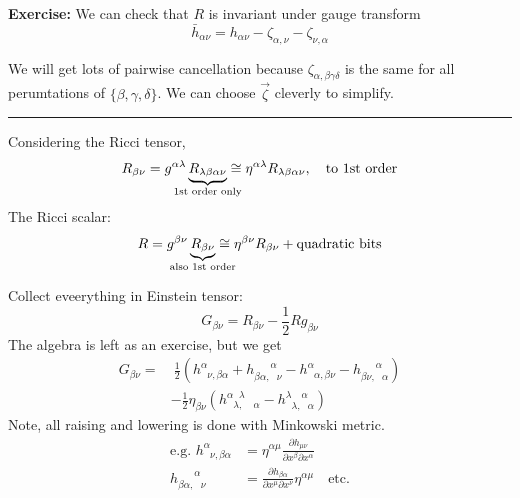 \documentclass[a4paper]{article} %
\newcommand{\exercise}[2]
{
\begin{framed}
\textbf{Exercise:} #1 \\\hrule
#2
\end{framed}
}
\begin{document}
\exercise{We can check that $R$ is invariant under gauge transform
\begin{equation}
\bar{h}_{\alpha\nu}=h_{\alpha\nu}-\zeta_{\alpha,\nu}-\zeta_{\nu,\alpha}
\end{equation}

We will get lots of pairwise cancellation because $\zeta_{\alpha,\beta \gamma\delta}$ is the same for all perumtations of $\{\beta,\gamma,\delta\}$. We can choose $\vec{\zeta}$ cleverly to simplify.
}
{}

Considering the Ricci tensor,
\begin{equation}
R_{\beta\nu}=g^{\alpha\lambda} \underbrace{R_{\lambda\beta\alpha\nu}}_{\mathclap{\text{1st order only}}}
\cong \eta^{\alpha\lambda} R_{\lambda\beta\alpha\nu},\quad\text{to 1st order}
\end{equation}
The Ricci scalar:
\begin{equation}
R = g^{\beta\nu} \underbrace{R_{\beta\nu}}_{\mathclap{\text{also 1st order}}} \cong \eta^{\beta\nu} R_{\beta\nu}+
\text{quadratic bits}
\end{equation}

Collect eveerything in Einstein tensor:
\begin{equation}
G_{\beta\nu}=R_{\beta\nu}-\frac{1}{2}R g_{\beta\nu}
\end{equation}
The algebra is left as an exercise, but we get
\begin{align}
G_{\beta\nu}=&~\frac{1}{2}\left(h^{\alpha}_{\phantom{\alpha}\nu,\beta\alpha}+h_{\beta\alpha,\phantom{\alpha}\nu}
^{\phantom{\beta\alpha,}\alpha} - h^{\alpha}_{\phantom{\alpha}\alpha,\beta\nu}- h_{\beta\nu,\phantom{\alpha}\alpha}
^{\phantom{\beta\nu,}\alpha}\right)\\
&-\frac{1}{2}\eta_{\beta\nu}
\left( h^{\alpha\phantom{\lambda}\lambda}_{\phantom{\alpha}\lambda,\phantom{\lambda,}\alpha}
- h^{\lambda\phantom{\lambda,}\alpha}_{\phantom{\lambda}\lambda,\phantom{\alpha}\alpha}\right)
\end{align}
Note, all raising and lowering is done with Minkowski metric.
\begin{align}
\text{e.g. } h^{\alpha}_{\phantom{\alpha}\nu,\beta\alpha}&
=\eta^{\alpha\mu}\frac{\partial h_{\mu\nu}}{\partial x^{\beta}\partial x^{\alpha}}\\
h_{\beta\alpha,\phantom{\alpha}\nu}^{\phantom{\beta\alpha,}\alpha}&=
\frac{\partial h_{\beta\alpha}}{\partial x^{\mu} \partial x^{\nu}}\eta^{\alpha\mu}\quad\text{etc.}
\end{align}
\end{document}
